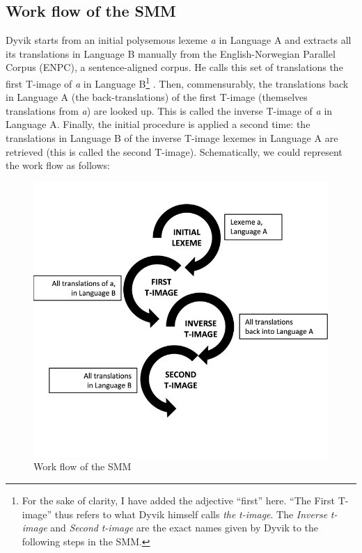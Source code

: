 \subsection{\label{sec:3.4.1}  Work flow of the SMM}

Dyvik starts from an initial polysemous lexeme \textit{a} in Language A and extracts all its translations in Language B manually from the English-Norwegian Parallel Corpus (ENPC), a sentence-aligned corpus. He calls this set of translations the first T-image of \textit{a} in Language B\footnote{For the sake of clarity, I have added the adjective “first” here. “The First T-image” thus refers to what Dyvik himself calls \textit{the} \textit{t-image}. The \textit{Inverse} \textit{t-image} and \textit{Second} \textit{t-image} are the exact names given by Dyvik to the following steps in the SMM.} . Then, commensurably, the translations back in Language A (the back-translations) of the first T-image (themselves translations from \textit{a}) are looked up. This is called the inverse T-image of \textit{a} in Language A. Finally, the initial procedure is applied a second time: the translations in Language B of the inverse T-image lexemes in Language A are retrieved (this is called the second T-image). Schematically, we could represent the work flow as follows:


\begin{figure}
\includegraphics[height=.3\textheight]{figures/Vandevoorde2-img7.jpg}
\caption{\label{fig:key:8}  Work flow of the SMM}
\end{figure}

